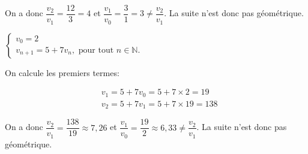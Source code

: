 \documentclass[11pt,a4paper]{article}  %
\begin{document}
\begin{enumMet}
\begin{corrBox}
		
		On a donc $\dfrac{v_2}{v_1}=\dfrac{12}{3}=4$ et $\dfrac{v_1}{v_0}=\dfrac{3}{1}=3\neq\dfrac{v_2}{v_1}$. La suite n'est donc pas géométrique.
	\end{corrBox}
	\item $\left\{\begin{array}{l}v_0=2 \\ v_{n+1}=5+7 v_n, \text { pour tout } n \in \mathbb{N} .\end{array}\right.$
	\begin{corrBox}
		On calcule les premiers termes:
		
		$$
		\begin{aligned}
			& v_1=5+7 v_0=5+7 \times 2=19 \\
			& v_2=5+7 v_1=5+7 \times 19=138
		\end{aligned}
		$$
		
		
		On a donc $\dfrac{v_2}{v_1}=\dfrac{138}{19} \approx 7,26$ et $\dfrac{v_1}{v_0}=\dfrac{19}{2} \approx 6,33\neq\dfrac{v_2}{v_1}$. La suite n'est donc pas géométrique.		
	\end{corrBox}
\end{enumMet}

\end{document}
